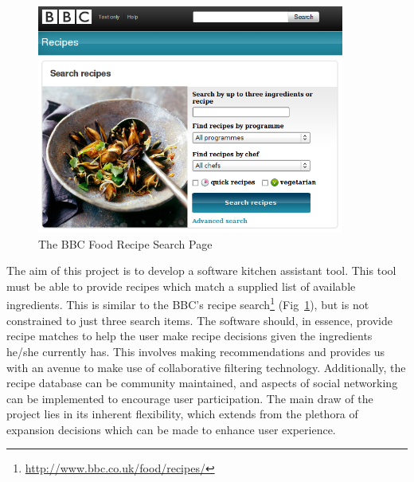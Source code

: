 \begin{figure}
\includegraphics[width=0.9\textwidth]{screenshot_bbc_recipes}
\caption{The BBC Food Recipe Search Page}
\label{fig:bbc_food}
\end{figure}

The aim of this project is to develop a software kitchen assistant tool. This tool must be able to provide recipes which match a supplied list of available ingredients. This is similar to the BBC's recipe search\footnote{\url{http://www.bbc.co.uk/food/recipes/}} (Fig~\ref{fig:bbc_food}), but is not constrained to just three search items. The software should, in essence, provide recipe matches to help the user make recipe decisions given the ingredients he/she currently has. This involves making recommendations and provides us with an avenue to make use of collaborative filtering technology. Additionally, the recipe database can be community maintained, and aspects of social networking can be implemented to encourage user participation. The main draw of the project lies in its inherent flexibility, which extends from the plethora of expansion decisions which can be made to enhance user experience.
